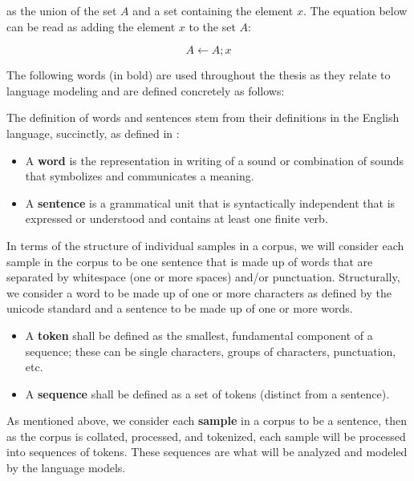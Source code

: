 \documentclass[12pt]{article}
\begin{document}
\noindent
as the union of the set $A$ and a set containing the element $x$. The equation below can be read as adding the element $x$ to the set $A$:

\begin{equation*}
    A \leftarrow A; x
\end{equation*}

The following words (in bold) are used throughout the thesis as they relate to language modeling and are defined concretely as follows:

The definition of words and sentences stem from their definitions in the English language, succinctly, as defined in \cite{noauthor_american_2011}:

\begin{itemize}
    \item A \textbf{word} is the representation in writing of a sound or combination of sounds that symbolizes and communicates a meaning.
    \item A \textbf{sentence} is a grammatical unit that is syntactically independent that is expressed or understood and contains at least one finite
          verb.
\end{itemize}

\noindent
In terms of the structure of individual samples in a corpus, we will consider each sample in the corpus to be one sentence that is made up of words
that are separated by whitespace (one or more spaces) and/or punctuation. Structurally, we consider a word to be made up of one or more characters
as defined by the unicode standard \cite{allen_unicode_2012} and a sentence to be made up of one or more words.

\begin{itemize}
    \item A \textbf{token} shall be defined as the smallest, fundamental component of a sequence; these can be single characters, groups of
          characters, punctuation, etc. \cite{devlin_bert_2019,wu_googles_2016,sennrich_neural_2016}
    \item A \textbf{sequence} shall be defined as a set of tokens (distinct from a sentence).
\end{itemize}

\noindent
As mentioned above, we consider each \textbf{sample} in a corpus to be a sentence, then as the corpus is collated, processed, and tokenized, each
sample will be processed into sequences of tokens. These sequences are what will be analyzed and modeled by the language models.
\end{document}
